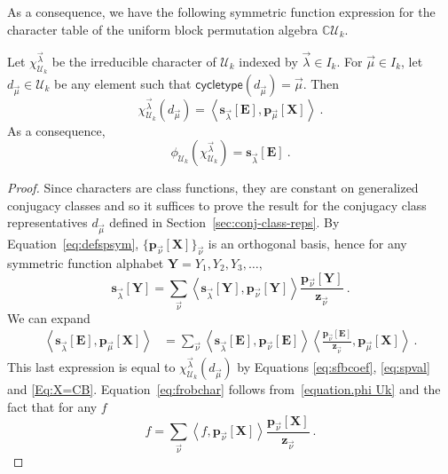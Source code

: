 \documentclass[ALCO,Unicode]{cedram}
\newcommand{\CC}{\mathbb C}
\newcommand{\XXX}{\mathbf{X}}
\newcommand{\EEE}{\mathbf{E}}
\begin{document}
As a consequence, we have the following symmetric function expression for
the character table of the uniform block permutation algebra $\CC\mathcal{U}_k$.
\begin{theorem}
\label{conj:frobchar}
Let $\chi^{\vec{\lambda}}_{\mathcal{U}_k}$ be the irreducible character of $\mathcal{U}_k$ indexed by $\vec{\lambda}\in I_k$.
For $\vec{\mu} \in I_k$, let $d_{\vec{\mu}} \in \mathcal{U}_k$ be any element
such that $\mathsf{cycletype}(d_{\vec{\mu}}) = \vec{\mu}$. Then
\begin{equation}\label{eq:sfexpr}
\chi^{\vec{\lambda}}_{\mathcal{U}_k}(d_{\vec{\mu}}) = \left< \mathbf{s}_{\vec{\lambda}}[\EEE], \mathbf{p}_{\vec{\mu}}[\XXX] \right>~.
\end{equation}
As a consequence,
\begin{equation}
\label{eq:frobchar}
    \phi_{\mathcal{U}_k}( \chi^{\vec{\lambda}}_{\mathcal{U}_k} )
    = \mathbf{s}_{\vec{\lambda}}[\EEE]~.
\end{equation}
\end{theorem}

\begin{proof}
Since characters are class functions, they are constant on generalized
conjugacy classes and so it suffices to prove the result for the conjugacy
class representatives $d_{\vec{\mu}}$ defined in Section~\ref{sec:conj-class-reps}.
By Equation~\eqref{eq:defspsym}, $\{ \mathbf{p}_{\vec{\nu}}[\XXX] \}_{\vec{\nu}}$
is an orthogonal basis, hence for any symmetric function alphabet $\mathbf{Y} = Y_1, Y_2, Y_3, \ldots$,
$$\mathbf{s}_{\vec{\lambda}}[\mathbf{Y}] = \sum_{\vec{\nu}}
\left< \mathbf{s}_{\vec{\lambda}}[\mathbf{Y}], \mathbf{p}_{\vec{\nu}}[\mathbf{Y}]\right>
\frac{\mathbf{p}_{\vec{\nu}}[\mathbf{Y}]}{\mathbf{z}_{\vec{\nu}}}~.
$$
We can expand
\begin{align}\label{eq:sfversionXeqCB}
\left< \mathbf{s}_{\vec{\lambda}}[\EEE], \mathbf{p}_{\vec{\mu}}[\XXX] \right>&=
\sum_{\vec{\nu}} \left< \mathbf{s}_{\vec{\lambda}}[\EEE],
\mathbf{p}_{\vec{\nu}}[\EEE] \right>
\left< \frac{\mathbf{p}_{\vec{\nu}}[\EEE]}{\mathbf{z}_{\vec{\nu}}},\mathbf{p}_{\vec{\mu}}[\XXX] \right>~.
\end{align}
This last expression is equal to $\chi^{\vec{\lambda}}_{\mathcal{U}_k}(d_{\vec{\mu}})$
by Equations \eqref{eq:sfbcoef}, \eqref{eq:spval} and \eqref{Eq:X=CB}.
Equation~\eqref{eq:frobchar} follows from~\eqref{equation.phi Uk} and the fact that for any $f$
$$f = \sum_{\vec{\nu}} \left< f, \mathbf{p}_{\vec{\nu}}[\XXX]\right>
\frac{\mathbf{p}_{\vec{\nu}}[\XXX]}{\mathbf{z}_{\vec{\nu}}}~.
$$
\end{proof}
\end{document}
